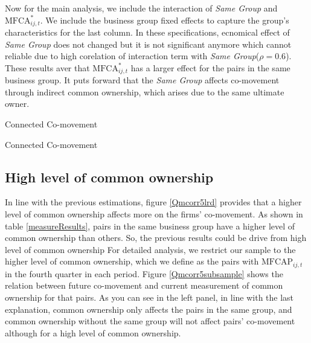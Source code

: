 	
	Now for the main analysis, we include the interaction of \textit{Same Group} and $\text{MFCA}^*_{ij,t}$. We include the business group fixed effects to capture the group's characteristics for the last column. In these specifications, ecnomical effect of \textit{Same Group} does not changed but it is not significant anymore which  cannot reliable due to high corelation of interaction term with \textit{Same Group}($\rho = 0.6$). These results aver that $\text{MFCA}^*_{ij,t}$ has a larger effect for the pairs in the same business group. It puts forward that the \textit{Same Group}  affects co-movement through indirect common ownership, which arises due to the same ultimate owner. 
	
	
	


{\begin{table}[p]
		\centering
		\caption{Connected Co-movement}
		\label{mresult2part1}
		\resizebox{1\textwidth}{!}{
			
				{}
			
		}
\end{table}}

{\begin{table}[p]
		\centering
		\caption{Connected Co-movement}
		\label{mresult2part2}
		\resizebox{1\textwidth}{!}{
			
				{}
			
		}
\end{table}}


		\FloatBarrier
		
		
		
		\subsection{{High level of common ownership}}
		
			In line with the previous estimations, figure \ref{Qmcorr5lrd} provides that a higher level of common ownership affects more on the firms' co-movement. As shown in table \ref{measureResults}, pairs in the same business group have a higher level of common ownership than others. So, the previous results could be drive from high level of common ownership For detailed analysis, we restrict our sample to the higher level of common ownership, which we define as the pairs with $\text{MFCAP}_{ij,t}$ in the fourth quarter in each period. Figure \ref{Qmcorr5subsample} shows the relation between future co-movement and current measurement of common ownership for that pairs. As you can see in the left panel, in line with the last explanation, common ownership only affects the pairs in the same group, and common ownership without the same group will not affect pairs' co-movement although for a high level of common ownership.
			
